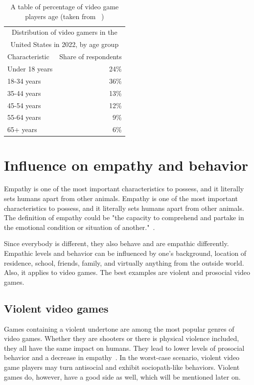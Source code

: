 \documentclass[10pt,twoside,english,a4paper]{article}
\begin{document}
\begin{table}[h]
\centering
\begin{tabular}{ |p{3cm} r| }
 \hline
 \multicolumn{2}{|c|}{Distribution of video gamers in the} \\
 \multicolumn{2}{|c|}{United States in 2022, by age group} \\
 \hline
 Characteristic & Share of respondents\\
 \hline
 Under 18 years & 24\%\\
 18-34 years & 36\%\\
 35-44 years & 13\%\\
 45-54 years & 12\%\\
 55-64 years & 9\%\\
 65+ years & 6\%\\
 \hline
\end{tabular}
\caption{A table of percentage of video game players age (taken from ~\cite{age2022})}
\end{table}

\section{Influence on empathy and behavior} \label{empathy}
Empathy is one of the most important characteristics to possess, and it literally sets humans apart from other animals. Empathy is one of the most important characteristics to possess, and it literally sets humans apart from other animals. The definition of empathy could be "the capacity to comprehend and partake in the emotional condition or situation of another."~\cite{empathy}.

Since everybody is different, they also behave and are empathic differently. Empathic levels and behavior can be influenced by one's background, location of residence, school, friends, family, and virtually anything from the outside world. Also, it applies to video games. The best examples are violent and prosocial video games.

\subsection{Violent video games} \label{violent}
Games containing a violent undertone are among the most popular genres of video games. Whether they are shooters or there is physical violence included, they all have the same impact on humans. They lead to lower levels of prosocial behavior and a decrease in empathy~\cite{empathy}. In the worst-case scenario, violent video game players may turn antisocial and exhibit sociopath-like behaviors. Violent games do, however, have a good side as well, which will be mentioned later on.
\end{document}
